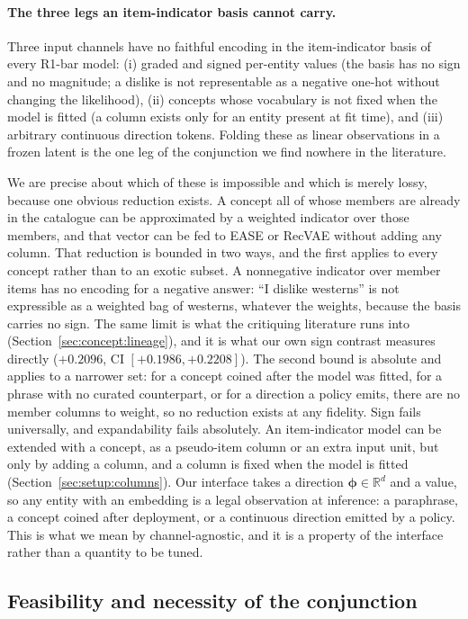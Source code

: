 \documentclass[acmsmall,review,anonymous]{acmart}
\newcommand{\R}{\mathbb{R}}
\newcommand{\bphi}{\boldsymbol{\phi}}
\begin{document}
\paragraph{The three legs an item-indicator basis cannot carry.}
Three input channels have no faithful encoding in the item-indicator basis of every R1-bar model: (i) graded and signed per-entity values (the basis has no sign and no magnitude; a dislike is not representable as a negative one-hot without changing the likelihood), (ii) concepts whose vocabulary is not fixed when the model is fitted (a column exists only for an entity present at fit time), and (iii) arbitrary continuous direction tokens. Folding these as linear observations in a frozen latent is the one leg of the conjunction we find nowhere in the literature.

We are precise about which of these is impossible and which is merely lossy, because one obvious reduction exists. A concept all of whose members are already in the catalogue can be approximated by a weighted indicator over those members, and that vector can be fed to EASE or RecVAE without adding any column. That reduction is bounded in two ways, and the first applies to every concept rather than to an exotic subset. A nonnegative indicator over member items has no encoding for a negative answer: ``I dislike westerns'' is not expressible as a weighted bag of westerns, whatever the weights, because the basis carries no sign. The same limit is what the critiquing literature runs into (Section~\ref{sec:concept:lineage}), and it is what our own sign contrast measures directly ($+0.2096$, CI $[+0.1986,+0.2208]$). The second bound is absolute and applies to a narrower set: for a concept coined after the model was fitted, for a phrase with no curated counterpart, or for a direction a policy emits, there are no member columns to weight, so no reduction exists at any fidelity. Sign fails universally, and expandability fails absolutely. An item-indicator model can be extended with a concept, as a pseudo-item column or an extra input unit, but only by adding a column, and a column is fixed when the model is fitted (Section~\ref{sec:setup:columns}). Our interface takes a direction $\bphi\in\R^{d}$ and a value, so any entity with an embedding is a legal observation at inference: a paraphrase, a concept coined after deployment, or a continuous direction emitted by a policy. This is what we mean by channel-agnostic, and it is a property of the interface rather than a quantity to be tuned.

\subsection{Feasibility and necessity of the conjunction}\label{sec:gap:why}
\end{document}
